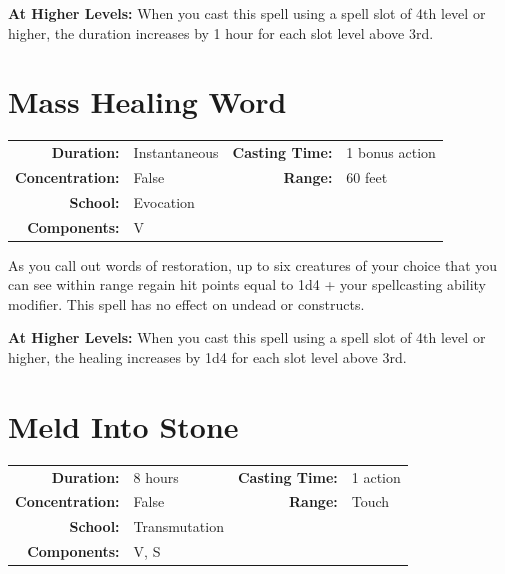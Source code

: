 \documentclass[12pt,showtrims]{memoir}
\begin{document}
\vspace{8pt} \noindent\textbf{At Higher Levels:} When you cast this spell using a spell slot of 4th level or higher, the duration increases by 1 hour for each slot level above 3rd.
\newpage
\section*{Mass Healing Word}

{
\small\centering\vspace{-6pt}
\begin{tabular}{rlrl}
\toprule

\textbf{Duration:} & Instantaneous &
\textbf{Casting Time:} & 1 bonus action \\
\textbf{Concentration:} & False &
\textbf{Range:} & 60 feet \\
\textbf{School:} & Evocation \\
\textbf{Components:} & \multicolumn{3}{p{0.7\textwidth}}{V}\\

\bottomrule
\end{tabular}
}

\vspace{1\baselineskip}\noindent As you call out words of restoration, up to six creatures of your choice that you can see within range regain hit points equal to 1d4 + your spellcasting ability modifier. This spell has no effect on undead or constructs.

\vspace{8pt} \noindent\textbf{At Higher Levels:} When you cast this spell using a spell slot of 4th level or higher, the healing increases by 1d4 for each slot level above 3rd.
\newpage
\section*{Meld Into Stone}

{
\small\centering\vspace{-6pt}
\begin{tabular}{rlrl}
\toprule

\textbf{Duration:} & 8 hours &
\textbf{Casting Time:} & 1 action \\
\textbf{Concentration:} & False &
\textbf{Range:} & Touch \\
\textbf{School:} & Transmutation \\
\textbf{Components:} & \multicolumn{3}{p{0.7\textwidth}}{V, S}\\

\bottomrule
\end{tabular}
}
\end{document}
